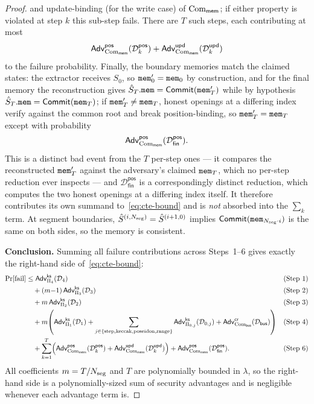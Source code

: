 \begin{proof}
and update-binding (for the write case) of $\mathrm{Com}_{\mathsf{mem}}$; if either
property is violated at step $k$ this sub-step fails.  There are $T$
such steps, each contributing at most
\[
  \mathsf{Adv}^{\mathsf{pos}}_{\mathrm{Com}_{\mathsf{mem}}}(\mathcal{D}^{\mathsf{pos}}_k)
+\mathsf{Adv}^{\mathsf{upd}}_{\mathrm{Com}_{\mathsf{mem}}}(\mathcal{D}^{\mathsf{upd}}_k)
\]
to the failure probability.
Finally, the boundary memories match the claimed states: the extractor receives
$S_0$, so $\mathtt{mem}_0'=\mathtt{mem}_0$ by construction, and for the final memory the
reconstruction gives $\hat{S}_T.\mathtt{mem}=\mathsf{Commit}(\mathtt{mem}_T')$ while by hypothesis
$\hat{S}_T.\mathtt{mem}=\mathsf{Commit}(\mathtt{mem}_T)$; if $\mathtt{mem}_T'\neq\mathtt{mem}_T$, honest openings at
a differing index verify against the common root and break position-binding, so
$\mathtt{mem}_T'=\mathtt{mem}_T$ except with probability
\[
  \mathsf{Adv}^{\mathsf{pos}}_{\mathrm{Com}_{\mathsf{mem}}}(\mathcal{D}^{\mathsf{pos}}_{\mathsf{fin}}).
\]
This is a distinct bad event from the $T$ per-step ones --- it compares the
reconstructed $\mathtt{mem}_T'$ against the adversary's claimed $\mathtt{mem}_T$, which no
per-step reduction ever inspects --- and $\mathcal{D}^{\mathsf{pos}}_{\mathsf{fin}}$
is a correspondingly distinct reduction, which computes the two honest openings
at a differing index itself.  It therefore contributes its own summand
to~\eqref{eq:cte-bound} and is \emph{not} absorbed into the $\sum_k$ term.
At segment boundaries, $\hat{S}^{(i,N_{\mathrm{seg}})}=\hat{S}^{(i+1,0)}$ implies
$\mathsf{Commit}(\mathtt{mem}_{N_{\mathrm{seg}}\cdot i})$ is the same on both sides, so the
memory is consistent.

\textbf{Conclusion.}
Summing all failure contributions across Steps~1--6 gives exactly the
right-hand side of~\eqref{eq:cte-bound}:
\begin{align*}
  \Pr[\text{fail}]
  &\leq \mathsf{Adv}^{\mathsf{ks}}_{\Pi_4}(\mathcal{D}_4)
    &&\text{(Step 1)}\\
  &\quad+(m{-}1)\,\mathsf{Adv}^{\mathsf{ks}}_{\Pi_3}(\mathcal{D}_3)
    &&\text{(Step 2)}\\
  &\quad+m\,\mathsf{Adv}^{\mathsf{ks}}_{\Pi_2}(\mathcal{D}_2)
    &&\text{(Step 3)}\\
  &\quad+m\!\left(
      \mathsf{Adv}^{\mathsf{ks}}_{\Pi_1}(\mathcal{D}_1)
      +\sum_{j\in\{\mathrm{step},\mathrm{keccak},\mathrm{poseidon},\mathrm{range}\}}\mathsf{Adv}^{\mathsf{ks}}_{\Pi_{0,j}}(\mathcal{D}_{0,j})
      +\mathsf{Adv}^{\mathsf{cr}}_{\mathrm{Com}_{\mathsf{bus}}}(\mathcal{D}_{\mathsf{bus}})
    \right)
    &&\text{(Step 4)}\\
  &\quad+\sum_{k=1}^{T}\!\left(
      \mathsf{Adv}^{\mathsf{pos}}_{\mathrm{Com}_{\mathsf{mem}}}(\mathcal{D}^{\mathsf{pos}}_k)
      +\mathsf{Adv}^{\mathsf{upd}}_{\mathrm{Com}_{\mathsf{mem}}}(\mathcal{D}^{\mathsf{upd}}_k)
    \right)
  +\mathsf{Adv}^{\mathsf{pos}}_{\mathrm{Com}_{\mathsf{mem}}}(\mathcal{D}^{\mathsf{pos}}_{\mathsf{fin}}).
    &&\text{(Step 6)}
\end{align*}
All coefficients $m = T/N_{\mathrm{seg}}$ and $T$ are polynomially bounded in $\lambda$,
so the right-hand side is a polynomially-sized sum of security advantages and is
negligible whenever each advantage term is.


\end{proof}
